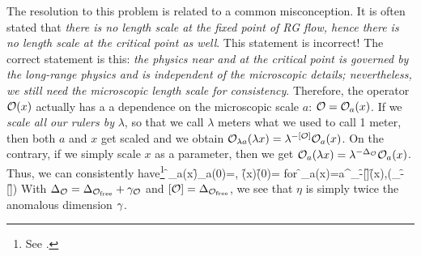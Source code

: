 \documentclass[12pt]{article}
\numberwithin{equation}{section}
\begin{document}
The resolution to this problem is related to a common misconception. It is often stated that 
\emph{there is no length scale at the fixed point of RG flow, hence there is no length scale at the critical point as well}. This statement is incorrect! The correct statement is this: \emph{the physics near and at the critical point is governed by the long-range physics and is independent of the microscopic details; nevertheless, we still need the microscopic length scale for consistency}. Therefore, the operator $\mathcal{O}(x)$ actually has a a dependence on the microscopic scale $a$: $\mathcal{O}=\mathcal{O}_a(x)$. If we \emph{scale all our rulers by} $\lambda$, so that we call $\lambda$ meters what we used to call 1 meter, then both $a$ and $x$ get scaled and we obtain $\mathcal{O}_{\lambda a}(\lambda x)=\lambda^{-[\mathcal{O}]}\mathcal{O}_{a}(x)$. On the contrary, if we simply scale $x$ as a parameter, then we get $\mathcal{O}_a(\lambda x)=\lambda^{-\Delta_{\mathcal{O}}}\mathcal{O}_a(x)$. Thus, we can consistently have\footnote{See .} 
\be 
\<\f_a(x)\f_a(0)\>=\;,\quad 
\<\f(x)\f(0)\>=
\ee 
for 
\be 
\f_a(x)=a^{\De_\f-[\f]}\f(x)\;,\quad{}(\De_\f-[\f])
\ee 
With $\Delta_{\mathcal{O}}=\Delta_{\mathcal{O}_{\text{free}}}+\gamma_{\mathcal{O}}$ and $[\mathcal{O}]=\Delta_{\mathcal{O}_{\text{free}}}$, we see that $\eta$ is simply twice the anomalous dimension $\gamma$.
\end{document}

